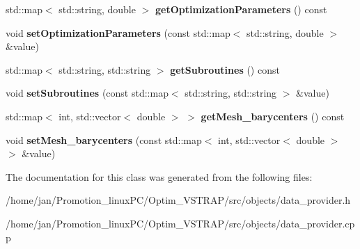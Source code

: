 \begin{DoxyCompactItemize}
std\+::map$<$ std\+::string, double $>$ {\bfseries get\+Optimization\+Parameters} () const
\item 
\mbox{\label{classdata__provider_a383c3c575367fe54838ae604d9302a43}} 
void {\bfseries set\+Optimization\+Parameters} (const std\+::map$<$ std\+::string, double $>$ \&value)
\item 
\mbox{\label{classdata__provider_a989d26fb2ac39f261047ae56217a2ea8}} 
std\+::map$<$ std\+::string, std\+::string $>$ {\bfseries get\+Subroutines} () const
\item 
\mbox{\label{classdata__provider_aedb02e579421139725605bcd4bab73a9}} 
void {\bfseries set\+Subroutines} (const std\+::map$<$ std\+::string, std\+::string $>$ \&value)
\item 
\mbox{\label{classdata__provider_aacf32aa7eff512e7b0a426c56066633c}} 
std\+::map$<$ int, std\+::vector$<$ double $>$ $>$ {\bfseries get\+Mesh\+\_\+barycenters} () const
\item 
\mbox{\label{classdata__provider_a865ecd48a9e2bb736f551640e78b1b92}} 
void {\bfseries set\+Mesh\+\_\+barycenters} (const std\+::map$<$ int, std\+::vector$<$ double $>$ $>$ \&value)
\end{DoxyCompactItemize}


The documentation for this class was generated from the following files\+:\begin{DoxyCompactItemize}
\item 
/home/jan/\+Promotion\+\_\+linux\+P\+C/\+Optim\+\_\+\+V\+S\+T\+R\+A\+P/src/objects/data\+\_\+provider.\+h\item 
/home/jan/\+Promotion\+\_\+linux\+P\+C/\+Optim\+\_\+\+V\+S\+T\+R\+A\+P/src/objects/data\+\_\+provider.\+cpp\end{DoxyCompactItemize}
